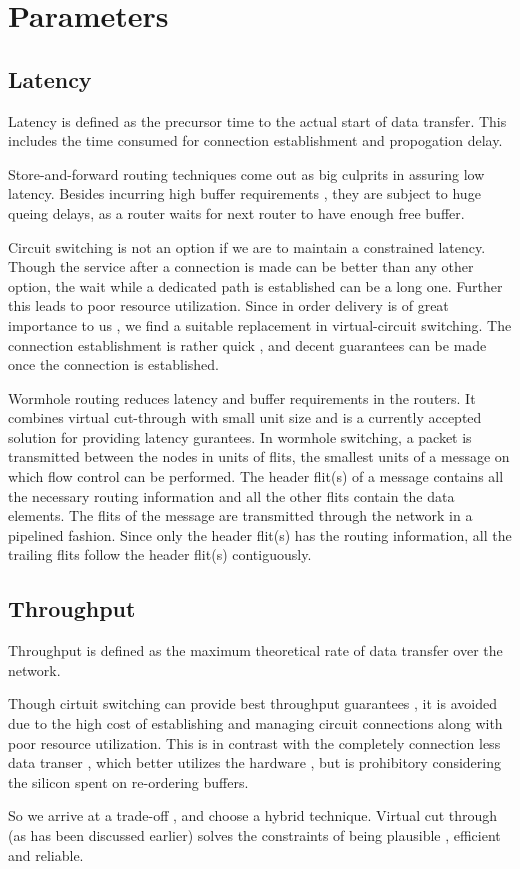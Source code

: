\section{Parameters}


\subsection{Latency}

Latency is defined as the precursor time to the actual start of data
transfer. This includes the time consumed for connection establishment
and propogation delay.

Store-and-forward routing techniques come out as big culprits in assuring
low latency. Besides incurring high buffer requirements , they are
subject to huge queing delays, as a router waits for next router to
have enough free buffer. 

Circuit switching is not an option if we are to maintain a constrained
latency. Though the service after a connection is made can be better
than any other option, the wait while a dedicated path is established
can be a long one. Further this leads to poor resource utilization.
Since in order delivery is of great importance to us , we find a suitable
replacement in virtual-circuit switching. The connection establishment
is rather quick , and decent guarantees can be made once the connection
is established.

Wormhole routing reduces latency and buffer requirements in the routers.
It combines virtual cut-through with small unit size and is a currently
accepted solution for providing latency gurantees. In wormhole switching,
a packet is transmitted between the nodes in units of flits, the smallest
units of a message on which flow control can be performed. The header
flit(s) of a message contains all the necessary routing information
and all the other flits contain the data elements. The flits of the
message are transmitted through the network in a pipelined fashion.
Since only the header flit(s) has the routing information, all the
trailing flits follow the header flit(s) contiguously. \cite{Mohapatra:1998:WRT:292469.292472}


\subsection{Throughput}

Throughput is defined as the maximum theoretical rate of data transfer
over the network.

Though cirtuit switching can provide best throughput guarantees ,
it is avoided due to the high cost of establishing and managing circuit
connections along with poor resource utilization. This is in contrast
with the completely connection less data transer , which better utilizes
the hardware , but is prohibitory considering the silicon spent on
re-ordering buffers.

So we arrive at a trade-off , and choose a hybrid technique. Virtual
cut through (as has been discussed earlier) solves the constraints
of being plausible , efficient and reliable.


